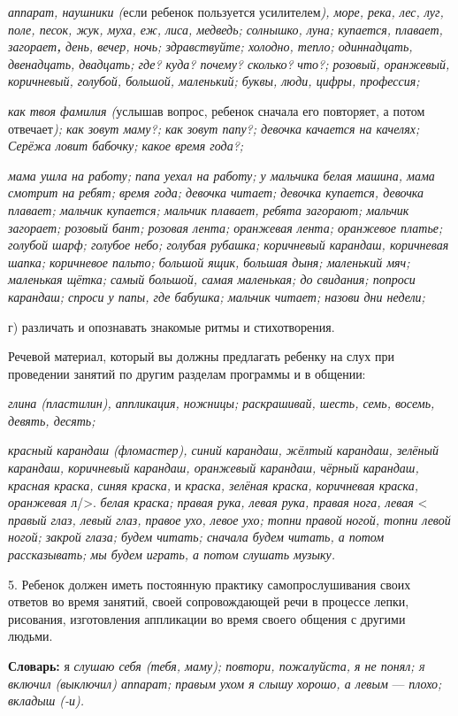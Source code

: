 \documentclass[a5paper]{book}
\renewcommand{\emph}[1]{\textit{#1}}
\begin{document}
\emph{аппарат, наушники (}если ребенок пользуется усилителем\emph{),
море, река, лес, луг, поле, песок, жук, муха, еж, лиса, медведь;
солнышко, луна; купается, плавает, загорает\textbf{,} день, вечер, ночь;
здравствуйте; холодно, тепло; одиннадцать, двенадцать, двадцать; где?
куда? почему? сколько?} \emph{что?; розовый, оранжевый, коричневый,
голубой, большой, маленький; буквы, люди, цифры, профессия;}

\emph{как твоя фамилия (}услышав вопрос, ребенок сначала его повторяет,
а потом отвечает\emph{); как зовут маму?; как зовут папу?; девочка
качается на качелях; Серёжа ловит бабочку; какое время года?;}

\emph{мама ушла на работу; папа уехал на работу; у мальчика белая
машина, мама смотрит на ребят; время года; девочка читает; девочка
купается, девочка плавает; мальчик купается; мальчик плавает, ребята
загорают; мальчик загорает; розовый бант; розовая лента; оранжевая
лента; оранжевое платье; голубой шарф; голубое небо; голубая рубашка;
коричневый карандаш, коричневая шапка; коричневое пальто; большой ящик,
большая дыня; маленький мяч; маленькая щётка; самый большой, самая
маленькая; до свидания; попроси карандаш; спроси у папы, где бабушка;
мальчик читает; назови дни недели;}

г) различать и опознавать знакомые ритмы и стихотворения.

Речевой материал, который вы должны предлагать ребенку на слух при
проведении занятий по другим разделам программы и в общении:

\emph{глина (пластилин), аппликация, ножницы; раскрашивай, шесть, семь,
восемь, девять, десять;}

\emph{красный карандаш (фломастер), синий карандаш, жёлтый карандаш,
зелёный карандаш, коричневый карандаш, оранжевый карандаш, чёрный
карандаш, красная краска, синяя краска,} и \emph{краска, зелёная краска,
коричневая краска, оранжевая} л/\textgreater. \emph{белая краска; правая
рука, левая рука, правая нога, левая} \textless{} \emph{правый глаз,
левый глаз, правое ухо, левое ухо; топни правой} \emph{ногой, топни
левой ногой; закрой глаза; будем читать; сначала будем читать, а потом
рассказывать; мы будем играть, а потом слушать музыку.}

5. Ребенок должен иметь постоянную практику самопрослушивания своих
ответов во время занятий, своей сопровождающей речи в процессе лепки,
рисования, изготовления аппликации во время своего общения с другими
людьми.

\textbf{Словарь:} я \emph{слушаю себя (тебя, маму); повтори, пожалуйста,
я не понял; \textsc{я} включил (выключил) аппарат; правым ухом я слышу}
\emph{хорошо, а левым} --- \emph{плохо; вкладыш (-и).}
\end{document}
